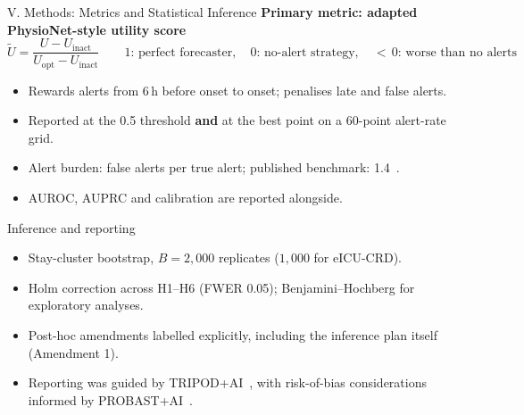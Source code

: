 \begin{frame}{V. Methods: Metrics and Statistical Inference}
\textbf{Primary metric: adapted PhysioNet-style utility
score}~\cite{reyna2020utility}
\[
  \widetilde{U} = \frac{U - U_{\text{inact}}}{U_{\text{opt}} - U_{\text{inact}}}
  \qquad
  1\text{: perfect forecaster},\quad
  0\text{: no-alert strategy},\quad
  {<}\,0\text{: worse than no alerts}
\]
\vspace{-6pt}
\begin{itemize}\itemsep2pt\small
  \item Rewards alerts from 6\,h before onset to onset; penalises late and
        false alerts.
  \item Reported at the 0.5 threshold \textbf{and} at the best point on a
        60-point alert-rate grid.
  \item Alert burden: false alerts per true alert; published benchmark:
        1.4~\cite{moor2023review}.
  \item AUROC, AUPRC and calibration are reported alongside.
\end{itemize}

\vspace{2pt}
\begin{exampleblock}{Inference and reporting}
\begin{itemize}\itemsep1pt\footnotesize
  \item Stay-cluster bootstrap, $B = 2{,}000$ replicates ($1{,}000$ for
        eICU-CRD).
  \item Holm correction across H1--H6 (FWER 0.05); Benjamini--Hochberg for
        exploratory analyses.
  \item Post-hoc amendments labelled explicitly, including the inference
        plan itself (Amendment 1).
  \item Reporting was guided by TRIPOD+AI~\cite{collins2024tripodai}, with
        risk-of-bias considerations informed by
        PROBAST+AI~\cite{moons2025probastai}.
\end{itemize}
\end{exampleblock}
\end{frame}
